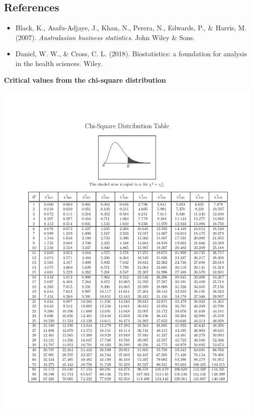 \documentclass[]{book}
\begin{document}
\hypertarget{references-1}{%
\subsection*{References}\label{references-1}}

\begin{itemize}
\item
  Black, K., Asafu-Adjaye, J., Khan, N., Perera, N., Edwards, P., \& Harris, M. (2007). \emph{Australasian business statistics}. John Wiley \& Sons.
\item
  Daniel, W. W., \& Cross, C. L. (2018). Biostatistics: a foundation for analysis in the health sciences. Wiley.
\end{itemize}

\newpage

\textbf{Critical values from the chi-square distribution}

\begin{center}\includegraphics[width=1\linewidth]{figure/chisquaretable} \end{center}
\end{document}
